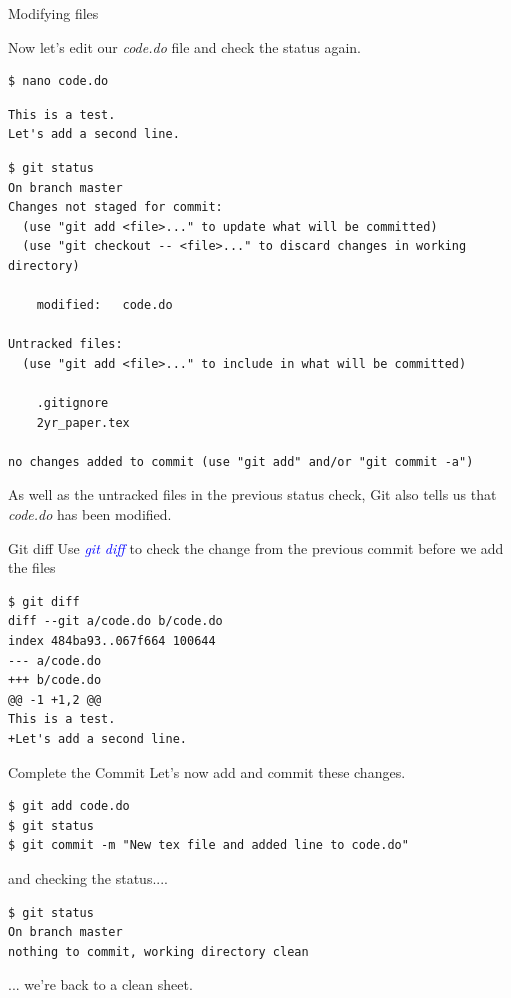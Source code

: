 \documentclass[11pt]{beamer}
\begin{document}
\begin{frame}[fragile]{Modifying files}

Now let's edit our \emph{code.do} file and check the status again.
\begin{lstlisting}
$ nano code.do
\end{lstlisting}
\begin{lstlisting}
This is a test.
Let's add a second line.
\end{lstlisting}
\begin{lstlisting}
$ git status
On branch master
Changes not staged for commit:
  (use "git add <file>..." to update what will be committed)
  (use "git checkout -- <file>..." to discard changes in working directory)

    modified:   code.do

Untracked files:
  (use "git add <file>..." to include in what will be committed)

    .gitignore
    2yr_paper.tex

no changes added to commit (use "git add" and/or "git commit -a")
\end{lstlisting}
As well as the untracked files in the previous status check, Git also tells us that \emph{code.do} has been modified.
\end{frame}


\begin{frame}[fragile]{Git diff}
Use \textcolor{blue}{\emph{git diff}} to check the change from the previous commit before we add the files
\begin{lstlisting}
$ git diff
diff --git a/code.do b/code.do
index 484ba93..067f664 100644
--- a/code.do
+++ b/code.do
@@ -1 +1,2 @@
This is a test.
+Let's add a second line.
\end{lstlisting}
\end{frame}
\begin{frame}[fragile]{Complete the Commit}
 Let's now add and commit these changes.
\begin{lstlisting}
$ git add code.do
$ git status
$ git commit -m "New tex file and added line to code.do"
\end{lstlisting}
and checking the status....
\begin{lstlisting}
$ git status
On branch master
nothing to commit, working directory clean
\end{lstlisting}
... we're back to a clean sheet.
\end{frame}
\end{document}
